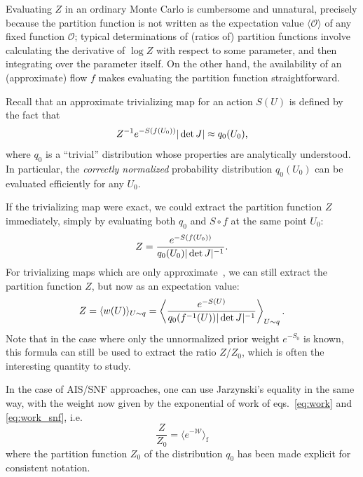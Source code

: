 \documentclass[12pt]{article}
\begin{document}
Evaluating $Z$ in an ordinary Monte Carlo is cumbersome and unnatural, precisely because the partition function is not written as the expectation value $\langle \mathcal O \rangle$ of any fixed function $\mathcal O$; typical determinations of (ratios of) partition functions involve calculating the derivative of $\log Z$ with respect to some parameter, and then integrating over the parameter itself. On the other hand, the availability of an (approximate) flow $f$ makes evaluating the partition function straightforward. 

Recall that an approximate trivializing map for an action $S(U)$ is defined by the fact that
\begin{equation}
    Z^{-1} e^{-S(f(U_0))} |\det J| \approx q_0(U_0)\text,
\end{equation}
where $q_0$ is a ``trivial'' distribution whose properties are analytically understood. In particular, the \emph{correctly normalized} probability distribution $q_0(U_0)$ can be evaluated efficiently for any $U_0$.

If the trivializing map were exact, we could extract the partition function $Z$ immediately, simply by evaluating both $q_0$ and $S \circ f$ at the same point $U_0$:
\begin{equation}
    Z = \frac{e^{-S(f(U_0))}}{q_0(U_0) |\det J|^{-1}}\text.
\end{equation}
For trivializing maps which are only approximate~\cite{Nicoli:2019gun,Nicoli:2020njz}, we can still extract the partition function $Z$, but now as an expectation value:
\begin{equation}
    Z = \langle w (U) \rangle_{U \sim q} = \left\langle \frac{e^{-S(U)}}{q_0(f^{-1}(U)) |\det J|^{-1}} \right\rangle_{U \sim q}
    \text.
\end{equation}
Note that in the case where only the unnormalized prior weight $e^{-S_0}$ is known, this formula can still be used to extract the ratio $Z/Z_0$, which is often the interesting quantity to study.

In the case of AIS/SNF approaches, one can use Jarzynski's equality in the same way, with the weight now given by the exponential of work of eqs.~\eqref{eq:work} and \eqref{eq:work_snf}, i.e.
\begin{equation}
    \frac{Z}{Z_0} = \langle e^{-\mathcal{W}} \rangle_\mathrm{f}
\end{equation}
where the partition function $Z_0$ of the distribution $q_0$ has been made explicit for consistent notation.
\end{document}
